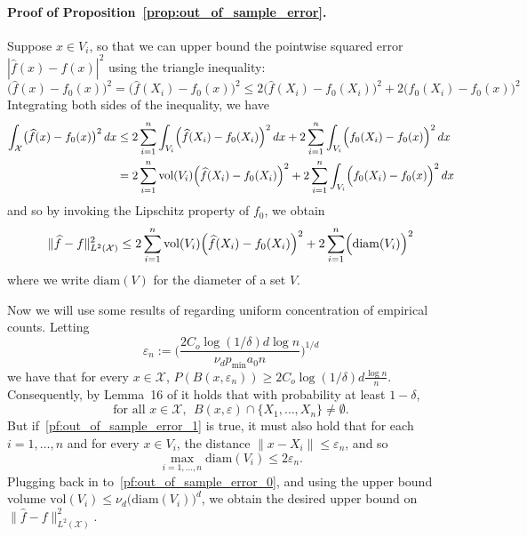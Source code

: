 \documentclass[twoside]{article}
\newcommand{\vol}{\text{vol}}
\newcommand{\1}{\mathbf{1}}
\newcommand{\Xset}{\mathcal{X}}
\newcommand{\Leb}{L}
\newcommand{\mc}[1]{\mathcal{#1}}
\newcommand{\dx}{\,dx}
\newcommand{\wh}[1]{\widehat{#1}}
\theoremstyle{definition}
\theoremstyle{remark}
\begin{document}
\paragraph{Proof of Proposition~\ref{prop:out_of_sample_error}.}
Suppose $x \in V_i$, so that we can upper bound the pointwise squared error $|\wh{f}(x) - f(x)|^2$ using the triangle inequality:
\begin{equation*}
\bigl(\wh{f}(x) - f_0(x)\bigr)^2 = \bigl(\wh{f}(X_i) - f_0(x)\bigr)^2 \leq 2\bigl(\wh{f}(X_i) - f_0(X_i)\bigr)^2 + 2\bigl(f_0(X_i) - f_0(x)\bigr)^2
\end{equation*}
Integrating both sides of the inequality, we have
\begin{align*}
\int_{\Xset} \bigl(\wh{f}(x) - f_0(x)\bigr)^2 \,dx & \leq 2  \sum_{i = 1}^{n} \int_{V_i} \Bigl(\wh{f}(X_i) - f_0(X_i)\Bigr)^2 \,dx + 2 \sum_{i = 1}^{n} \int_{V_i} \Bigl(f_0(X_i) - f_0(x)\Bigr)^2 \dx \\
& = 2 \sum_{i = 1}^{n} \vol(V_i) \Bigl(\wh{f}(X_i) - f_0(X_i)\Bigr)^2 + 2 \sum_{i = 1}^{n} \int_{V_i} \Bigl(f_0(X_i) - f_0(x)\Bigr)^2 \dx
\end{align*}
and so by invoking the Lipschitz property of $f_0$, we obtain
\begin{equation}
\label{pf:out_of_sample_error_0}
\|\wh{f} - f\|_{\Leb^2(\Xset)}^2 \leq 2 \sum_{i = 1}^{n} \vol(V_i) \Bigl(\wh{f}(X_i) - f_0(X_i)\Bigr)^2 + 2 \sum_{i = 1}^{n} \Bigl(\mathrm{diam}(V_i)\Bigr)^2
\end{equation}
where we write $\mathrm{diam}(V)$ for the diameter of a set $V$. 

Now we will use some results of \citep{chaudhuri2010} regarding uniform concentration of empirical counts. Letting
\begin{equation*}
\varepsilon_n := \biggl(\frac{2C_{o}\log(1/\delta)d\log n}{\nu_dp_{\min}a_0n}\biggr)^{1/d}
\end{equation*}
we have that for every $x \in \Xset$, $P(B(x,\varepsilon_n)) \geq 2C_{o}\log(1/\delta)d\frac{\log n}{n}$. Consequently, by Lemma~16 of \citep{chaudhuri2010} it holds that with probability at least $1 - \delta$,
\begin{equation}
\label{pf:out_of_sample_error_1}
\textrm{for all $x \in \mc{X}$},~~ B(x,\varepsilon) \cap \{X_1,\ldots,X_n\} \neq \emptyset.
\end{equation}
But if~\eqref{pf:out_of_sample_error_1} is true, it must also hold that for each $i = 1,\ldots,n$ and for every $x \in V_i$, the distance $\|x - X_i\| \leq \varepsilon_n$, and so
\begin{equation*}
\max_{i = 1,\ldots,n} \mathrm{diam}(V_i) \leq 2\varepsilon_n.
\end{equation*}
Plugging back in to~\eqref{pf:out_of_sample_error_0}, and using the upper bound volume $\vol(V_i) \leq \nu_d \bigl(\mathrm{diam}(V_i)\bigr)^d$, we obtain the desired upper bound on $\|\wh{f} - f\|_{\Leb^2(\Xset)}^2$.
\end{document}
